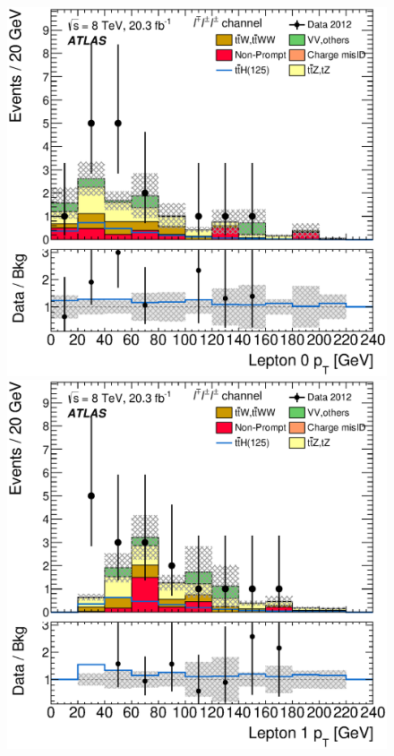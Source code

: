 %
\begin{figure}[!htbp]
  \begin{minipage}[h]{0.4\textwidth}
    \centering \includegraphics[width=\textwidth]{figs/results/results_new/3lep_SR_SortLep0Pt}
  \end{minipage}\hfill
  \begin{minipage}[h]{0.4\textwidth}
    \centering \includegraphics[width=\textwidth]{figs/results/results_new/3lep_SR_SortLep1Pt}

\end{minipage}
\end{figure}
